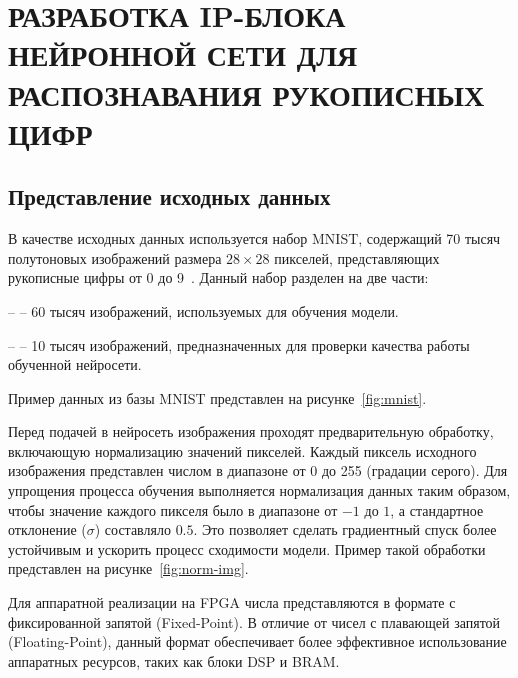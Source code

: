 \chapter[Разработка IP-блока нейронной сети для распознавания рукописных цифр]
{РАЗРАБОТКА IP-БЛОКА НЕЙРОННОЙ СЕТИ ДЛЯ РАСПОЗНАВАНИЯ РУКОПИСНЫХ ЦИФР}

\section{Представление исходных данных}\par
\hspace*{12.5 mm}В качестве исходных данных используется набор MNIST, 
содержащий 70 тысяч полутоновых изображений размера $28 \times 28$ пикселей, 
представляющих рукописные цифры от 0 до 9~\cite{MNIST}. Данный набор разделен 
на две части:

  –  – 60 тысяч изображений, используемых для 
обучения модели.

  –  – 10 тысяч изображений, предназначенных для 
проверки качества работы обученной нейросети.

    Пример данных из базы MNIST представлен на рисунке~\ref{fig:mnist}.


Перед подачей в нейросеть изображения проходят предварительную обработку, 
включающую нормализацию значений пикселей. Каждый пиксель исходного изображения
представлен числом в диапазоне от 0 до 255 (градации серого). Для упрощения 
процесса обучения выполняется нормализация данных таким образом, чтобы значение 
каждого пикселя было в диапазоне от $-1$ до $1$, а стандартное отклонение 
($\sigma$) составляло $0.5$. Это позволяет сделать градиентный спуск более 
устойчивым и ускорить процесс сходимости модели. Пример такой обработки 
представлен на рисунке~\ref{fig:norm-img}.


Для аппаратной реализации на FPGA числа представляются в формате с 
фиксированной запятой (Fixed-Point). В отличие от чисел с плавающей запятой 
(Floating-Point), данный формат обеспечивает более эффективное использование 
аппаратных ресурсов, таких как блоки DSP и BRAM.\@

